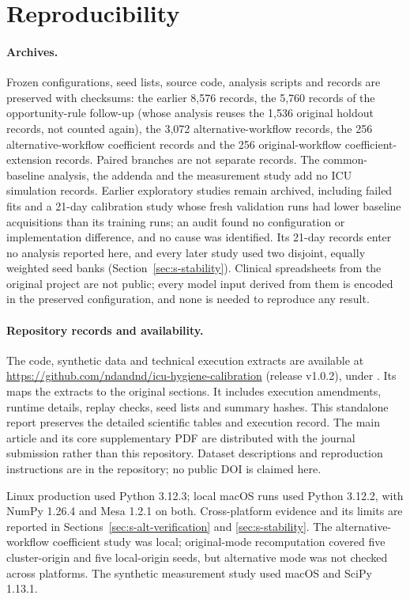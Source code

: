 \documentclass[11pt]{article}
\begin{document}
\section{Reproducibility}\label{sec:s-repro}
\paragraph{Archives.} Frozen configurations, seed lists, source code, analysis
scripts and records are preserved with checksums: the earlier 8,576 records, the
5,760 records of the opportunity-rule follow-up (whose analysis reuses the 1,536
original holdout records, not counted again), the 3,072 alternative-workflow
records, the 256 alternative-workflow coefficient records and the 256
original-workflow coefficient-extension records. Paired branches
are not separate records. The common-baseline analysis, the addenda and the
measurement study add no ICU simulation records. Earlier exploratory studies
remain archived, including failed fits and a 21-day calibration study
whose fresh validation runs had lower baseline acquisitions than its training
runs; an audit found no configuration or implementation difference, and no cause
was identified. Its 21-day records enter no analysis reported here, and every
later study used two disjoint, equally weighted seed banks
(Section~\ref{sec:s-stability}). Clinical spreadsheets from the original project
are not public; every model input derived from them is encoded in the preserved
configuration, and none is needed to reproduce any result.

\paragraph{Repository records and availability.}
The code, synthetic data and technical execution extracts are available at
\url{https://github.com/ndandnd/icu-hygiene-calibration} (release v1.0.2), under
.
Its  maps the extracts to the original sections. It includes
execution amendments, runtime details, replay checks, seed lists and summary
hashes. This standalone report preserves the detailed scientific tables and execution
record. The main article and its core supplementary PDF are distributed with
the journal submission rather than this repository.
Dataset descriptions and reproduction instructions are in the repository;
no public DOI is claimed here.

Linux production used Python 3.12.3; local macOS runs used Python 3.12.2,
with NumPy 1.26.4 and Mesa 1.2.1 on both. Cross-platform evidence and its limits
are reported in Sections~\ref{sec:s-alt-verification} and
\ref{sec:s-stability}. The alternative-workflow coefficient study was local;
original-mode recomputation covered five cluster-origin and five local-origin seeds,
but alternative mode was not checked across platforms. The synthetic
measurement study used macOS and SciPy 1.13.1.
\end{document}
